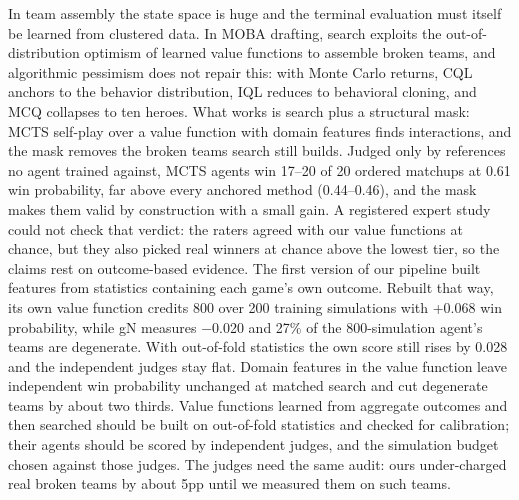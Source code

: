 \documentclass[journal]{IEEEtran}
\begin{document}
In team assembly the state space is huge and the terminal evaluation must itself be learned from clustered data. In MOBA drafting, search exploits the out-of-distribution optimism of learned value functions to assemble broken teams, and algorithmic pessimism does not repair this: with Monte Carlo returns, CQL anchors to the behavior distribution, IQL reduces to behavioral cloning, and MCQ collapses to ten heroes. What works is search plus a structural mask: MCTS self-play over a value function with domain features finds interactions, and the mask removes the broken teams search still builds. Judged only by references no agent trained against, MCTS agents win 17--20 of 20 ordered matchups at 0.61 win probability, far above every anchored method (0.44--0.46), and the mask makes them valid by construction with a small gain. A registered expert study could not check that verdict: the raters agreed with our value functions at chance, but they also picked real winners at chance above the lowest tier, so the claims rest on outcome-based evidence. The first version of our pipeline built features from statistics containing each game's own outcome. Rebuilt that way, its own value function credits 800 over 200 training simulations with +0.068 win probability, while gN measures $-$0.020 and 27\% of the 800-simulation agent's teams are degenerate. With out-of-fold statistics the own score still rises by 0.028 and the independent judges stay flat. Domain features in the value function leave independent win probability unchanged at matched search and cut degenerate teams by about two thirds. Value functions learned from aggregate outcomes and then searched should be built on out-of-fold statistics and checked for calibration; their agents should be scored by independent judges, and the simulation budget chosen against those judges. The judges need the same audit: ours under-charged real broken teams by about 5pp until we measured them on such teams.
\end{document}
